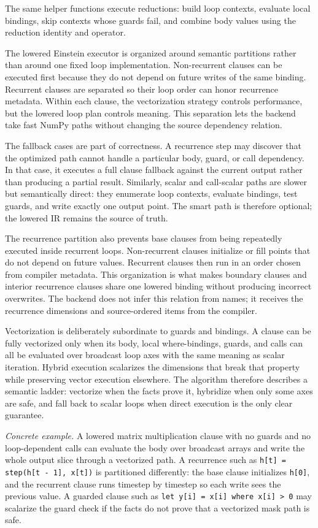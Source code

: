 The same helper functions execute reductions: build loop contexts, evaluate
local bindings, skip contexts whose guards fail, and combine body values using
the reduction identity and operator.

The lowered Einstein executor is organized around semantic partitions rather
than around one fixed loop implementation. Non-recurrent clauses can be
executed first because they do not depend on future writes of the same binding.
Recurrent clauses are separated so their loop order can honor recurrence
metadata. Within each clause, the vectorization strategy controls performance,
but the lowered loop plan controls meaning. This separation lets the backend
take fast NumPy paths without changing the source dependency relation.

The fallback cases are part of correctness. A recurrence step may discover that
the optimized path cannot handle a particular body, guard, or call dependency.
In that case, it executes a full clause fallback against the current output
rather than producing a partial result. Similarly, scalar and call-scalar paths
are slower but semantically direct: they enumerate loop contexts, evaluate
bindings, test guards, and write exactly one output point. The smart path is
therefore optional; the lowered IR remains the source of truth.

The recurrence partition also prevents base clauses from being repeatedly
executed inside recurrent loops. Non-recurrent clauses initialize or fill points
that do not depend on future values. Recurrent clauses then run in an order
chosen from compiler metadata. This organization is what makes boundary clauses
and interior recurrence clauses share one lowered binding without producing
incorrect overwrites. The backend does not infer this relation from names; it
receives the recurrence dimensions and source-ordered items from the compiler.

Vectorization is deliberately subordinate to guards and bindings. A clause can
be fully vectorized only when its body, local where-bindings, guards, and calls
can all be evaluated over broadcast loop axes with the same meaning as scalar
iteration. Hybrid execution scalarizes the dimensions that break that property
while preserving vector execution elsewhere. The algorithm therefore describes a
semantic ladder: vectorize when the facts prove it, hybridize when only some
axes are safe, and fall back to scalar loops when direct execution is the only
clear guarantee.

\textit{Concrete example.} A lowered matrix multiplication clause with no
guards and no loop-dependent calls can evaluate the body over broadcast arrays
and write the whole output slice through a vectorized path. A recurrence such
as \texttt{h[t] = step(h[t - 1], x[t])} is partitioned differently: the base
clause initializes \texttt{h[0]}, and the recurrent clause runs timestep by
timestep so each write sees the previous value. A guarded clause such as
\texttt{let y[i] = x[i] where x[i] > 0} may scalarize the guard check if the
facts do not prove that a vectorized mask path is safe.

